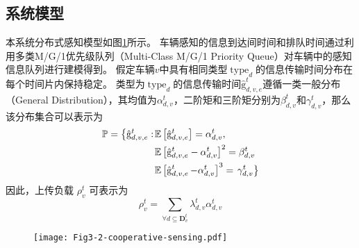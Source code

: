 \subsection{系统模型}
本系统分布式感知模型如图\ref{fig 2-3}所示。
车辆感知的信息到达间时间和排队时间通过利用多类M/G/1优先级队列（Multi-Class M/G/1 Priority Queue）\cite{qian2020minimizing}对车辆中的感知信息队列进行建模得到。
假定车辆$v$中具有相同类型$\operatorname{type}_d$的信息传输时间分布在每个时间片内保持稳定。
类型为$\operatorname{type}_d$的信息传输时间$\operatorname{\hat{g}}_{d, v, e}^t$遵循一类一般分布（General Distribution），其均值为$\alpha_{d, v}^t$，二阶矩和三阶矩分别为$\beta_{d, v}^t$和$\gamma_{d, v}^t$，那么该分布集合可以表示为
\begin{align}
	\mathbb{P}=\left\{\hat{\mathrm{g}}_{d, v, e}^t:\right. & \mathbb{E}\left[\hat{\mathrm{g}}_{d, v, e}^t\right]=\alpha_{d, v}^t, \notag \\
	& \mathbb{E}\left[\hat{\mathrm{g}}_{d, v, e}^t-\alpha_{d, v}^t\right]^2=\beta_{d, v}^t \notag \\
	& \mathbb{E}\left[\operatorname{\hat{g}}_{d, v, e}^t-\alpha_{d, v}^t\right]^{3}=\left.\gamma_{d, v}^t \right\}
\end{align}
因此，上传负载 $\rho_{v}^{t}$ 可表示为 
\begin{equation}
    \rho_{v}^{t}=\sum_{\forall d \subseteq \mathbf{D}_v^t} \lambda_{d,v}^{t}  \alpha_{d, v}^t
\end{equation}

\begin{figure}[h]
\centering
  \texttt{[image: Fig3-2-cooperative-sensing.pdf]}
  \label{fig 2-3}
\end{figure}

